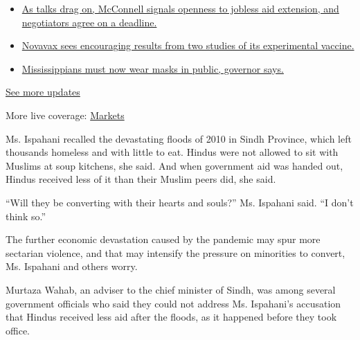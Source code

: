 \begin{itemize}
\tightlist
\item
  \href{https://www.nytimes.com/2020/08/04/world/coronavirus-cases.html?action=click\&pgtype=Article\&state=default\&region=MAIN_CONTENT_1\&context=storylines_live_updates\#link-762df92}{As
  talks drag on, McConnell signals openness to jobless aid extension,
  and negotiators agree on a deadline.}
\item
  \href{https://www.nytimes.com/2020/08/04/world/coronavirus-cases.html?action=click\&pgtype=Article\&state=default\&region=MAIN_CONTENT_1\&context=storylines_live_updates\#link-1228a480}{Novavax
  sees encouraging results from two studies of its experimental
  vaccine.}
\item
  \href{https://www.nytimes.com/2020/08/04/world/coronavirus-cases.html?action=click\&pgtype=Article\&state=default\&region=MAIN_CONTENT_1\&context=storylines_live_updates\#link-794484ed}{Mississippians
  must now wear masks in public, governor says.}
\end{itemize}

\href{https://www.nytimes.com/2020/08/04/world/coronavirus-cases.html?action=click\&pgtype=Article\&state=default\&region=MAIN_CONTENT_1\&context=storylines_live_updates}{See
more updates}

More live coverage:
\href{https://www.nytimes.com/live/2020/08/04/business/stock-market-today-coronavirus?action=click\&pgtype=Article\&state=default\&region=MAIN_CONTENT_1\&context=storylines_live_updates}{Markets}

Ms. Ispahani recalled the devastating floods of 2010 in Sindh Province,
which left thousands homeless and with little to eat. Hindus were not
allowed to sit with Muslims at soup kitchens, she said. And when
government aid was handed out, Hindus received less of it than their
Muslim peers did, she said.

``Will they be converting with their hearts and souls?'' Ms. Ispahani
said. ``I don't think so.''

The further economic devastation caused by the pandemic may spur more
sectarian violence, and that may intensify the pressure on minorities to
convert, Ms. Ispahani and others worry.

Murtaza Wahab, an adviser to the chief minister of Sindh, was among
several government officials who said they could not address Ms.
Ispahani's accusation that Hindus received less aid after the floods, as
it happened before they took office.

